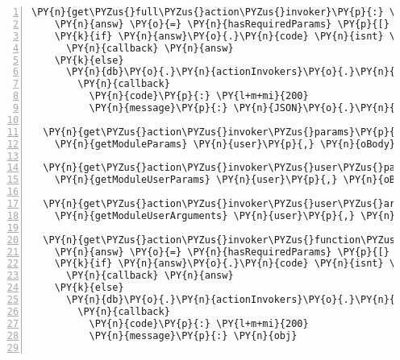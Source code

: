 \begin{Verbatim}[fontsize=\scriptsize,commandchars=\\\{\},numbers=left,firstnumber=1,stepnumber=1]
  \PY{n}{get\PYZus{}full\PYZus{}action\PYZus{}invoker}\PY{p}{:} \PY{p}{(} \PY{n}{user}\PY{p}{,} \PY{n}{oBody}\PY{p}{,} \PY{n}{callback} \PY{p}{)} \PY{o}{\PYZhy{}}\PY{o}{\PYZgt{}}
    \PY{n}{answ} \PY{o}{=} \PY{n}{hasRequiredParams} \PY{p}{[} \PY{l+s}{\PYZsq{}}\PY{l+s}{id}\PY{l+s}{\PYZsq{}} \PY{p}{]}\PY{p}{,} \PY{n}{oBody}
    \PY{k}{if} \PY{n}{answ}\PY{o}{.}\PY{n}{code} \PY{n}{isnt} \PY{l+m+mi}{200}
      \PY{n}{callback} \PY{n}{answ}
    \PY{k}{else}
      \PY{n}{db}\PY{o}{.}\PY{n}{actionInvokers}\PY{o}{.}\PY{n}{getModule} \PY{n}{user}\PY{o}{.}\PY{n}{username}\PY{p}{,} \PY{n}{oBody}\PY{o}{.}\PY{n}{id}\PY{p}{,} \PY{p}{(} \PY{n}{err}\PY{p}{,} \PY{n}{obj} \PY{p}{)} \PY{o}{\PYZhy{}}\PY{o}{\PYZgt{}}
        \PY{n}{callback}
          \PY{n}{code}\PY{p}{:} \PY{l+m+mi}{200}
          \PY{n}{message}\PY{p}{:} \PY{n}{JSON}\PY{o}{.}\PY{n}{stringify} \PY{n}{obj}

  \PY{n}{get\PYZus{}action\PYZus{}invoker\PYZus{}params}\PY{p}{:} \PY{p}{(} \PY{n}{user}\PY{p}{,} \PY{n}{oBody}\PY{p}{,} \PY{n}{callback} \PY{p}{)} \PY{o}{\PYZhy{}}\PY{o}{\PYZgt{}}
    \PY{n}{getModuleParams} \PY{n}{user}\PY{p}{,} \PY{n}{oBody}\PY{p}{,} \PY{n}{db}\PY{o}{.}\PY{n}{actionInvokers}\PY{p}{,} \PY{n}{callback}

  \PY{n}{get\PYZus{}action\PYZus{}invoker\PYZus{}user\PYZus{}params}\PY{p}{:} \PY{p}{(} \PY{n}{user}\PY{p}{,} \PY{n}{oBody}\PY{p}{,} \PY{n}{callback} \PY{p}{)} \PY{o}{\PYZhy{}}\PY{o}{\PYZgt{}}
    \PY{n}{getModuleUserParams} \PY{n}{user}\PY{p}{,} \PY{n}{oBody}\PY{p}{,} \PY{n}{db}\PY{o}{.}\PY{n}{actionInvokers}\PY{p}{,} \PY{n}{callback}

  \PY{n}{get\PYZus{}action\PYZus{}invoker\PYZus{}user\PYZus{}arguments}\PY{p}{:} \PY{p}{(} \PY{n}{user}\PY{p}{,} \PY{n}{oBody}\PY{p}{,} \PY{n}{callback} \PY{p}{)} \PY{o}{\PYZhy{}}\PY{o}{\PYZgt{}}
    \PY{n}{getModuleUserArguments} \PY{n}{user}\PY{p}{,} \PY{n}{oBody}\PY{p}{,} \PY{n}{db}\PY{o}{.}\PY{n}{actionInvokers}\PY{p}{,} \PY{n}{callback}

  \PY{n}{get\PYZus{}action\PYZus{}invoker\PYZus{}function\PYZus{}arguments}\PY{p}{:} \PY{p}{(} \PY{n}{user}\PY{p}{,} \PY{n}{oBody}\PY{p}{,} \PY{n}{callback} \PY{p}{)} \PY{o}{\PYZhy{}}\PY{o}{\PYZgt{}}
    \PY{n}{answ} \PY{o}{=} \PY{n}{hasRequiredParams} \PY{p}{[} \PY{l+s}{\PYZsq{}}\PY{l+s}{id}\PY{l+s}{\PYZsq{}} \PY{p}{]}\PY{p}{,} \PY{n}{oBody}
    \PY{k}{if} \PY{n}{answ}\PY{o}{.}\PY{n}{code} \PY{n}{isnt} \PY{l+m+mi}{200}
      \PY{n}{callback} \PY{n}{answ}
    \PY{k}{else}
      \PY{n}{db}\PY{o}{.}\PY{n}{actionInvokers}\PY{o}{.}\PY{n}{getModuleField} \PY{n}{user}\PY{o}{.}\PY{n}{username}\PY{p}{,} \PY{n}{oBody}\PY{o}{.}\PY{n}{id}\PY{p}{,} \PY{l+s}{\PYZsq{}}\PY{l+s}{functionArgs}\PY{l+s}{\PYZsq{}}\PY{p}{,} \PY{p}{(} \PY{n}{err}\PY{p}{,} \PY{n}{obj} \PY{p}{)} \PY{o}{\PYZhy{}}\PY{o}{\PYZgt{}}
        \PY{n}{callback}
          \PY{n}{code}\PY{p}{:} \PY{l+m+mi}{200}
          \PY{n}{message}\PY{p}{:} \PY{n}{obj}
  

\end{Verbatim}
